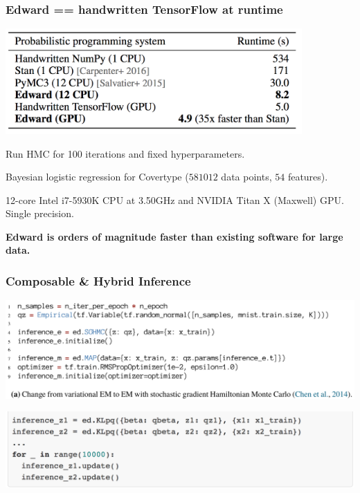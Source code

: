 \documentclass[10pt,
               xcolor={usenames,dvipsnames},
               hyperref={colorlinks,linktoc=all,citecolor=Plum,linkcolor=MidnightBlue,urlcolor=MidnightBlue},noamssymb]{beamer}
\begin{document}
\begin{frame}
\frametitle{Edward == handwritten TensorFlow at runtime}
\begin{center}
\includegraphics[width=0.85\textwidth]{img/experiments_hmc.png}
\end{center}
\vspace{-1ex}
Run HMC for 100 iterations and fixed hyperparameters.

Bayesian logistic regression for Covertype ($581012$ data points, $54$
features).

12-core Intel i7-5930K CPU at 3.50GHz and NVIDIA Titan X (Maxwell) GPU.
Single precision.

\vspace{4ex}
\textbf{Edward is orders of magnitude faster than existing software
for large data.}
\end{frame}

\begin{frame}
\frametitle{Composable \& Hybrid Inference}

\begin{center}
\vspace{-2ex}
\includegraphics[width=1.0\textwidth]{img/em.png}
\vspace{2ex}

\includegraphics[width=1.0\textwidth]{img/ep.png}
\end{center}

\end{frame}
\end{document}
